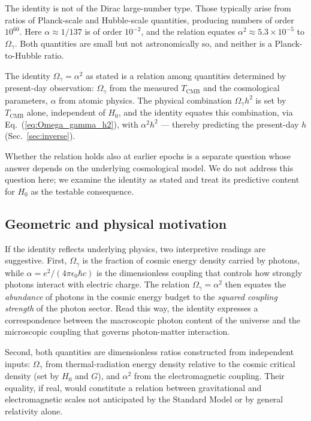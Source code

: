 \documentclass[12pt, a4paper]{article}
\begin{document}
The identity is not of the Dirac large-number type. Those typically arise from ratios of Planck-scale and Hubble-scale quantities, producing numbers of order $10^{60}$. Here $\alpha \approx 1/137$ is of order $10^{-2}$, and the relation equates $\alpha^2 \approx 5.3 \times 10^{-5}$ to $\Omega_\gamma$. Both quantities are small but not astronomically so, and neither is a Planck-to-Hubble ratio.

The identity $\Omega_\gamma = \alpha^2$ as stated is a relation among quantities determined by present-day observation: $\Omega_\gamma$ from the measured $T_{\mathrm{CMB}}$ and the cosmological parameters, $\alpha$ from atomic physics. The physical combination $\Omega_\gamma h^2$ is set by $T_{\mathrm{CMB}}$ alone, independent of $H_0$, and the identity equates this combination, via Eq.~(\ref{eq:Omega_gamma_h2}), with $\alpha^2 h^2$ --- thereby predicting the present-day $h$ (Sec.~\ref{sec:inverse}).

Whether the relation holds also at earlier epochs is a separate question whose answer depends on the underlying cosmological model. We do not address this question here; we examine the identity as stated and treat its predictive content for $H_0$ as the testable consequence.

\subsection{Geometric and physical motivation}
\label{sec:geometric}

If the identity reflects underlying physics, two interpretive readings are suggestive. First, $\Omega_\gamma$ is the fraction of cosmic energy density carried by photons, while $\alpha = e^2/(4\pi\epsilon_0\hbar c)$ is the dimensionless coupling that controls how strongly photons interact with electric charge. The relation $\Omega_\gamma = \alpha^2$ then equates the \emph{abundance} of photons in the cosmic energy budget to the \emph{squared coupling strength} of the photon sector. Read this way, the identity expresses a correspondence between the macroscopic photon content of the universe and the microscopic coupling that governs photon-matter interaction.

Second, both quantities are dimensionless ratios constructed from independent inputs: $\Omega_\gamma$ from thermal-radiation energy density relative to the cosmic critical density (set by $H_0$ and $G$), and $\alpha^2$ from the electromagnetic coupling. Their equality, if real, would constitute a relation between gravitational and electromagnetic scales not anticipated by the Standard Model or by general relativity alone.
\end{document}
